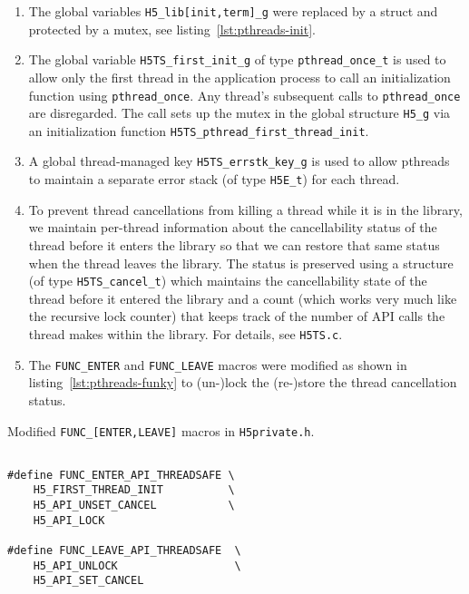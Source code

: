 \begin{enumerate}
    \item The global variables \texttt{H5\_lib[init,term]\_g} were replaced by a struct and protected by a mutex, see listing~\ref{lst:pthreads-init}.
    \item The global variable \texttt{H5TS\_first\_init\_g} of type \texttt{pthread\_once\_t} is used to allow only the first thread in the application process to call an initialization function using \texttt{pthread\_once}. Any thread's subsequent calls to \texttt{pthread\_once} are disregarded. The call sets up the mutex in the global structure \texttt{H5\_g} via an initialization function \texttt{H5TS\_pthread\_first\_thread\_init}.
    \item A global thread-managed key \texttt{H5TS\_errstk\_key\_g} is used to allow pthreads to maintain a separate error stack (of type \texttt{H5E\_t}) for each thread.
    \item To prevent thread cancellations from killing a thread while it is in the library, we maintain per-thread information about the cancellability status of the thread before it enters the library so that we can restore that same status when the thread leaves the library. The status is preserved using a structure (of type \texttt{H5TS\_cancel\_t}) which maintains the cancellability state of the thread before it entered the library and a count (which works very much like the recursive lock counter) that keeps track of the number of API calls the thread makes within the library. For details, see \texttt{H5TS.c}.
    \item The \texttt{FUNC\_ENTER} and \texttt{FUNC\_LEAVE} macros were modified as shown in listing~\ref{lst:pthreads-funky} to (un-)lock the (re-)store the thread cancellation status.
\end{enumerate}


\begin{listing}
\centering
\caption{Modified \texttt{FUNC\_[ENTER,LEAVE]} macros in \texttt{H5private.h}.}
\label{lst:pthreads-funky}
\begin{verbatim}

#define FUNC_ENTER_API_THREADSAFE \                            
    H5_FIRST_THREAD_INIT          \
    H5_API_UNSET_CANCEL           \
    H5_API_LOCK

#define FUNC_LEAVE_API_THREADSAFE  \
    H5_API_UNLOCK                  \
    H5_API_SET_CANCEL

\end{verbatim}
\end{listing}

